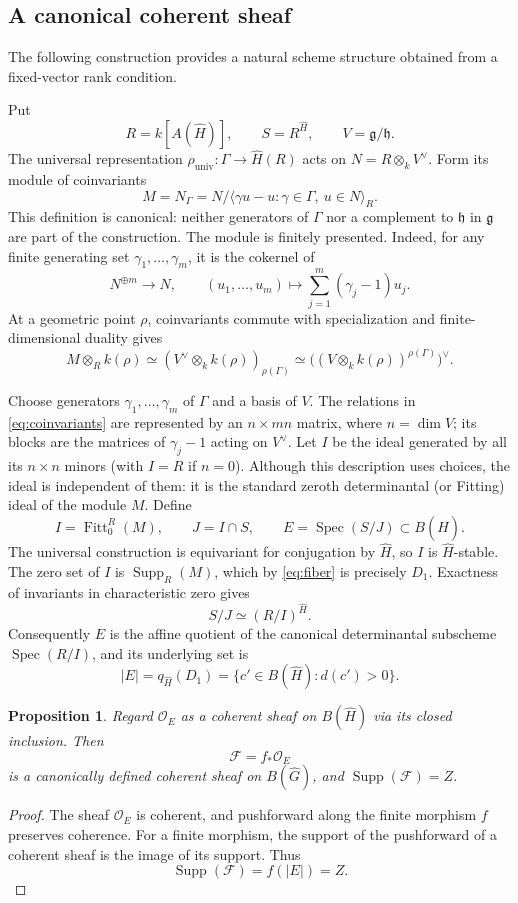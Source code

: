 \documentclass[11pt,a4paper]{amsart}
\DeclareMathOperator{\Spec}{Spec}
\DeclareMathOperator{\Supp}{Supp}
\DeclareMathOperator{\Fitt}{Fitt}
\newtheorem{proposition}[theorem]{Proposition}
\theoremstyle{definition}
\theoremstyle{remark}
\begin{document}
\subsection{A canonical coherent sheaf}
The following construction provides a natural
scheme structure obtained from a fixed-vector rank condition.

Put
$$
 R=k[A(\hat H)],\qquad S=R^{\hat H},\qquad V=\mathfrak g/\mathfrak h.
$$
The universal representation $\rho_{\mathrm{univ}}:\Gamma\to \hat H(R)$
acts on $N=R\otimes_k V^\vee$. Form its module of coinvariants
\begin{equation}\label{eq:coinvariants}
 M=N_\Gamma
 =N\big/\langle\gamma u-u:\gamma\in\Gamma,\ u\in N\rangle_R.
\end{equation}
This definition is canonical: neither generators of $\Gamma$ nor a
complement to $\mathfrak h$ in $\mathfrak g$ are part of the construction.
The module is finitely presented. Indeed, for any finite generating set
$\gamma_1,\ldots,\gamma_m$, it is the cokernel of
$$
 N^{\oplus m}\longrightarrow N,\qquad
 (u_1,\ldots,u_m)\longmapsto
 \sum_{j=1}^m(\gamma_j-1)u_j.
$$
At a geometric point $\rho$, coinvariants commute with specialization and
finite-dimensional duality gives
\begin{equation}\label{eq:fiber}
 M\otimes_R k(\rho)
 \simeq(V^\vee\otimes_k k(\rho))_{\rho(\Gamma)}
 \simeq\bigl((V\otimes_k k(\rho))^{\rho(\Gamma)}\bigr)^\vee.
\end{equation}

Choose generators $\gamma_1,\ldots,\gamma_m$ of $\Gamma$ and a
basis of $V$. The relations in \eqref{eq:coinvariants} are represented
by an $n\times mn$ matrix, where $n=\dim V$; its blocks are the
matrices of $\gamma_j-1$ acting on $V^\vee$.
Let $I$ be the ideal generated by all its $n\times n$ minors (with
$I=R$ if $n=0$). Although this description uses choices, the ideal
is independent of them: it is the standard zeroth determinantal
(or Fitting) ideal of the module $M$. Define
$$
 I=\Fitt_0^R(M),\qquad J=I\cap S,
 \qquad E=\Spec(S/J)\subset B(\hat H).
$$
The universal construction is equivariant for conjugation by $\hat H$,
so $I$ is $\hat H$-stable. The zero set of $I$ is $\Supp_R(M)$, which by
\eqref{eq:fiber} is precisely $D_1$.
Exactness of invariants in characteristic zero gives
$$
 S/J\simeq(R/I)^{\hat H}.
$$
Consequently $E$ is the affine quotient of the canonical determinantal
subscheme $\Spec(R/I)$, and its underlying set is
$$
 |E|=q_{\hat H}(D_1)=\{c'\in B(\hat H):d(c')>0\}.
$$

\begin{proposition}
Regard $\mathcal O_E$ as a coherent sheaf on $B(\hat H)$ via its closed
inclusion. Then
$$
 {\mathcal F=f_*\mathcal O_E}
$$
is a canonically defined coherent sheaf on $B(\hat G)$, and
$\Supp(\mathcal F)=Z$.
\end{proposition}
\begin{proof}
The sheaf $\mathcal O_E$ is coherent, and pushforward along the finite
morphism $f$ preserves coherence. For a finite morphism, the support of
the pushforward of a coherent sheaf is the image of its support. Thus
$$
 \Supp(\mathcal F)=f(|E|)=Z.
$$
\end{proof}
\end{document}
